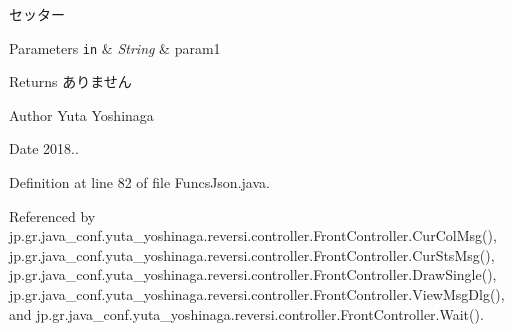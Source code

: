 セッター 


\begin{DoxyParams}[1]{Parameters}
\mbox{\tt in}  & {\em String} & param1 \\
\hline
\end{DoxyParams}
\begin{DoxyReturn}{Returns}
ありません 
\end{DoxyReturn}
\begin{DoxyAuthor}{Author}
Yuta Yoshinaga 
\end{DoxyAuthor}
\begin{DoxyDate}{Date}
2018.. 
\end{DoxyDate}


Definition at line 82 of file Funcs\+Json.\+java.



Referenced by jp.\+gr.\+java\+\_\+conf.\+yuta\+\_\+yoshinaga.\+reversi.\+controller.\+Front\+Controller.\+Cur\+Col\+Msg(), jp.\+gr.\+java\+\_\+conf.\+yuta\+\_\+yoshinaga.\+reversi.\+controller.\+Front\+Controller.\+Cur\+Sts\+Msg(), jp.\+gr.\+java\+\_\+conf.\+yuta\+\_\+yoshinaga.\+reversi.\+controller.\+Front\+Controller.\+Draw\+Single(), jp.\+gr.\+java\+\_\+conf.\+yuta\+\_\+yoshinaga.\+reversi.\+controller.\+Front\+Controller.\+View\+Msg\+Dlg(), and jp.\+gr.\+java\+\_\+conf.\+yuta\+\_\+yoshinaga.\+reversi.\+controller.\+Front\+Controller.\+Wait().

